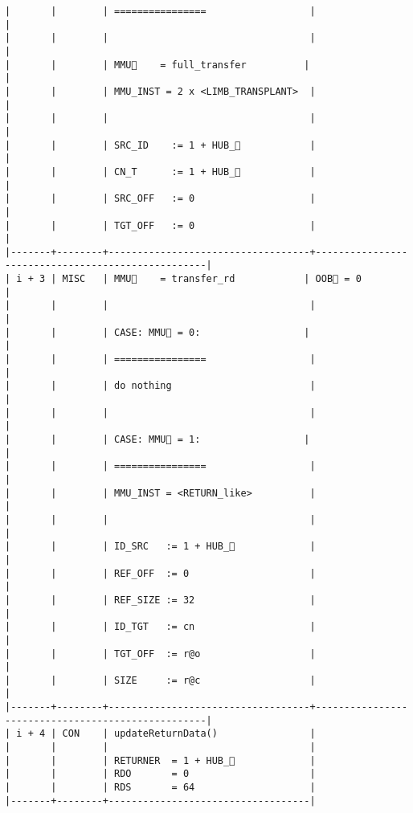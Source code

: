 \documentclass[varwidth=\maxdimen,margin=0.5cm,multi={verbatim}]{standalone}
\begin{document}
\begin{verbatim}
|       |        | ================                  |                                                   |
|       |        |                                   |                                                   |
|       |        | MMU🏴    = full_transfer          |                                                   |
|       |        | MMU_INST = 2 x <LIMB_TRANSPLANT>  |                                                   |
|       |        |                                   |                                                   |
|       |        | SRC_ID    := 1 + HUB_            |                                                   |
|       |        | CN_T      := 1 + HUB_            |                                                   |
|       |        | SRC_OFF   := 0                    |                                                   |
|       |        | TGT_OFF   := 0                    |                                                   |
|-------+--------+-----------------------------------+---------------------------------------------------|
| i + 3 | MISC   | MMU🏴    = transfer_rd            | OOB🏴 = 0                                         |
|       |        |                                   |                                                   |
|       |        | CASE: MMU🏴 = 0:                  |                                                   |
|       |        | ================                  |                                                   |
|       |        | do nothing                        |                                                   |
|       |        |                                   |                                                   |
|       |        | CASE: MMU🏴 = 1:                  |                                                   |
|       |        | ================                  |                                                   |
|       |        | MMU_INST = <RETURN_like>          |                                                   |
|       |        |                                   |                                                   |
|       |        | ID_SRC   := 1 + HUB_             |                                                   |
|       |        | REF_OFF  := 0                     |                                                   |
|       |        | REF_SIZE := 32                    |                                                   |
|       |        | ID_TGT   := cn                    |                                                   |
|       |        | TGT_OFF  := r@o                   |                                                   |
|       |        | SIZE     := r@c                   |                                                   |
|-------+--------+-----------------------------------+---------------------------------------------------|
| i + 4 | CON    | updateReturnData()                |
|       |        |                                   |
|       |        | RETURNER  = 1 + HUB_             |
|       |        | RDO       = 0                     |
|       |        | RDS       = 64                    |
|-------+--------+-----------------------------------|

\end{verbatim}
\end{document}
